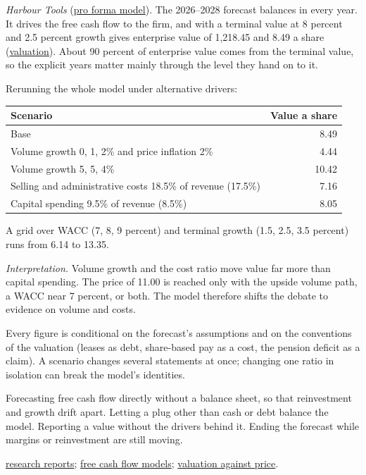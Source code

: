 \begin{qfmethod}
 \emph{Harbour Tools} (\hyperref[ex:harbour-pro-forma-model]{pro forma model}). The 2026--2028 forecast balances in every year. It drives the free cash flow to the firm, and with a terminal value at 8 percent and 2.5 percent growth gives enterprise value of 1,218.45 and 8.49 a share (\hyperref[meth:forecast-horizon-steady-state]{valuation}). About 90 percent of enterprise value comes from the terminal value, so the explicit years matter mainly through the level they hand on to it.

Rerunning the whole model under alternative drivers:
\begin{center}\small
\begin{tabular}{@{}lr@{}}
\toprule
Scenario & Value a share \\
\midrule
Base & 8.49 \\
Volume growth 0, 1, 2\% and price inflation 2\% & 4.44 \\
Volume growth 5, 5, 4\% & 10.42 \\
Selling and administrative costs 18.5\% of revenue (17.5\%) & 7.16 \\
Capital spending 9.5\% of revenue (8.5\%) & 8.05 \\
\bottomrule
\end{tabular}
\end{center}
A grid over WACC (7, 8, 9 percent) and terminal growth (1.5, 2.5, 3.5 percent) runs from 6.14 to 13.35.

\emph{Interpretation.} Volume growth and the cost ratio move value far more than capital spending. The price of 11.00 is reached only with the upside volume path, a WACC near 7 percent, or both. The model therefore shifts the debate to evidence on volume and costs.

 Every figure is conditional on the forecast's assumptions and on the conventions of the valuation (leases as debt, share-based pay as a cost, the pension deficit as a claim). A scenario changes several statements at once; changing one ratio in isolation can break the model's identities.

 Forecasting free cash flow directly without a balance sheet, so that reinvestment and growth drift apart. Letting a plug other than cash or debt balance the model. Reporting a value without the drivers behind it. Ending the forecast while margins or reinvestment are still moving.

 \hyperref[def:research-report-evaluation]{research reports}; \hyperref[meth:fcf-valuation-models]{free cash flow models}; \hyperref[meth:valuation-price-judgement]{valuation against price}.

\end{qfmethod}

